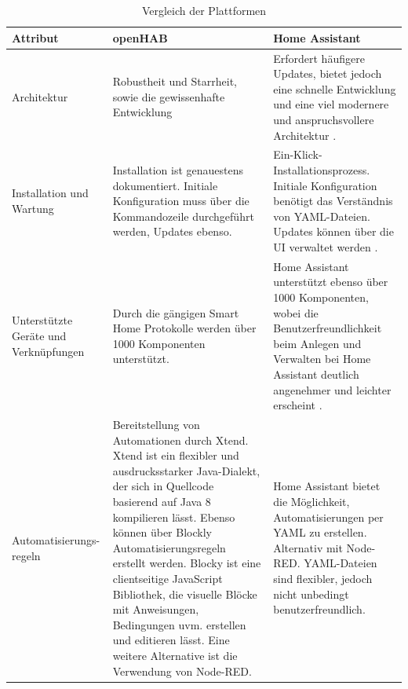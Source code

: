 \documentclass[
  ngerman           %
  ,twoside          %
  ,11pt
  ,pdftex
]{report}
\begin{document}
\chapter{}
\label{appendix:comparison}
\begin{table}[hbt!]
  \begin{center}
      \begin{tabular}{| p{3.0cm} | p{6.2cm} | p{6.2cm} | }
          \hline
            \textbf{Attribut} & \textbf{openHAB} & \textbf{Home Assistant} \\
          \hline
            Architektur & Robustheit und Starrheit, sowie die gewissenhafte Entwicklung & Erfordert häufigere Updates, bietet jedoch eine schnelle Entwicklung und eine viel modernere und anspruchsvollere Architektur \cite{sh-uni-comparison}. \\ 
          \hline
            Installation und Wartung & Installation ist genauestens dokumentiert. Initiale Konfiguration muss über die Kommandozeile durchgeführt werden, Updates ebenso. & Ein-Klick-Installationsprozess. Initiale Konfiguration benötigt das Verständnis von YAML-Dateien. Updates können über die UI verwaltet werden \cite{sh-uni-comparison}. \\ 
          \hline
            Unterstützte Geräte und Verknüpfungen & Durch die gängigen Smart Home Protokolle werden über 1000 Komponenten unterstützt. & Home Assistant unterstützt ebenso über 1000 Komponenten, wobei die Benutzerfreundlichkeit beim Anlegen und Verwalten bei Home Assistant deutlich angenehmer und leichter erscheint \cite{msuttner-comparison}. \\ 
          \hline
            Automatisierungs-regeln & Bereitstellung von Automationen durch Xtend. Xtend ist ein flexibler und ausdrucksstarker Java-Dialekt, der sich in Quellcode basierend auf Java 8 kompilieren lässt. Ebenso können über Blockly Automatisierungsregeln erstellt werden. Blocky ist eine clientseitige JavaScript Bibliothek, die visuelle Blöcke mit Anweisungen, Bedingungen uvm. erstellen und editieren lässt. Eine weitere Alternative ist die Verwendung von Node-RED.  & Home Assistant bietet die Möglichkeit, Automatisierungen per YAML zu erstellen. Alternativ mit Node-RED. YAML-Dateien sind flexibler, jedoch nicht unbedingt benutzerfreundlich. \\ 
          \hline
      \end{tabular}
  \end{center}
  \caption{Vergleich der Plattformen \cite{sh-uni-comparison} \cite{msuttner-comparison} \cite{barclay-comparison}}
  \label{tab:comparisonTableHAOS-openHAB-part1}
\end{table}
\end{document}
